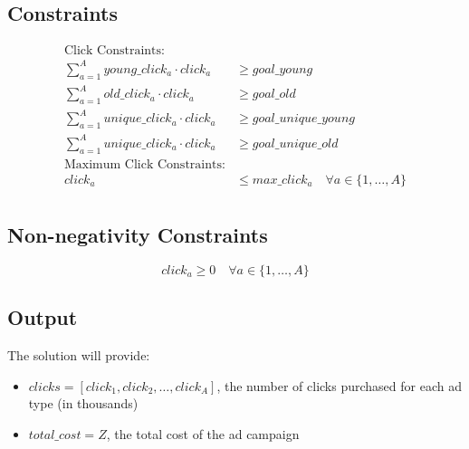 \documentclass{article}
\begin{document}
\subsection*{Constraints}
\begin{align*}
\text{Click Constraints:} & \\
\sum_{a=1}^{A} young\_click_a \cdot click_a & \geq goal\_young \\
\sum_{a=1}^{A} old\_click_a \cdot click_a & \geq goal\_old \\
\sum_{a=1}^{A} unique\_click_a \cdot click_a & \geq goal\_unique\_young \\
\sum_{a=1}^{A} unique\_click_a \cdot click_a & \geq goal\_unique\_old \\

\text{Maximum Click Constraints:} & \\
click_a & \leq max\_click_a \quad \forall a \in \{1, \ldots, A\} \\
\end{align*}

\subsection*{Non-negativity Constraints}
\[
click_a \geq 0 \quad \forall a \in \{1, \ldots, A\}
\]

\subsection*{Output}
The solution will provide:
\begin{itemize}
    \item $clicks = [click_1, click_2, \ldots, click_A]$, the number of clicks purchased for each ad type (in thousands)
    \item $total\_cost = Z$, the total cost of the ad campaign
\end{itemize}
\end{document}
